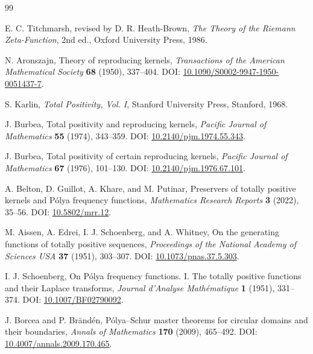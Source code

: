\documentclass[11pt]{amsart}
\numberwithin{equation}{section}
\theoremstyle{plain}
\theoremstyle{definition}
\theoremstyle{remark}
\begin{document}
\begin{thebibliography}{99}

E. C. Titchmarsh, revised by D. R. Heath-Brown,
\emph{The Theory of the Riemann Zeta-Function}, 2nd ed.,
Oxford University Press, 1986.

N. Aronszajn,
Theory of reproducing kernels,
\emph{Transactions of the American Mathematical Society} \textbf{68} (1950), 337--404.
DOI: \href{https://doi.org/10.1090/S0002-9947-1950-0051437-7}{10.1090/S0002-9947-1950-0051437-7}.

S. Karlin,
\emph{Total Positivity, Vol. I},
Stanford University Press, Stanford, 1968.

J. Burbea,
Total positivity and reproducing kernels,
\emph{Pacific Journal of Mathematics} \textbf{55} (1974), 343--359.
DOI: \href{https://doi.org/10.2140/pjm.1974.55.343}{10.2140/pjm.1974.55.343}.

J. Burbea,
Total positivity of certain reproducing kernels,
\emph{Pacific Journal of Mathematics} \textbf{67} (1976), 101--130.
DOI: \href{https://doi.org/10.2140/pjm.1976.67.101}{10.2140/pjm.1976.67.101}.

A. Belton, D. Guillot, A. Khare, and M. Putinar,
Preservers of totally positive kernels and Pólya frequency functions,
\emph{Mathematics Research Reports} \textbf{3} (2022), 35--56.
DOI: \href{https://doi.org/10.5802/mrr.12}{10.5802/mrr.12}.

M. Aissen, A. Edrei, I. J. Schoenberg, and A. Whitney,
On the generating functions of totally positive sequences,
\emph{Proceedings of the National Academy of Sciences USA} \textbf{37} (1951), 303--307.
DOI: \href{https://doi.org/10.1073/pnas.37.5.303}{10.1073/pnas.37.5.303}.

I. J. Schoenberg,
On Pólya frequency functions. I. The totally positive functions and their Laplace transforms,
\emph{Journal d'Analyse Mathématique} \textbf{1} (1951), 331--374.
DOI: \href{https://doi.org/10.1007/BF02790092}{10.1007/BF02790092}.

J. Borcea and P. Brändén,
Pólya--Schur master theorems for circular domains and their boundaries,
\emph{Annals of Mathematics} \textbf{170} (2009), 465--492.
DOI: \href{https://doi.org/10.4007/annals.2009.170.465}{10.4007/annals.2009.170.465}.

\end{thebibliography}
\end{document}

